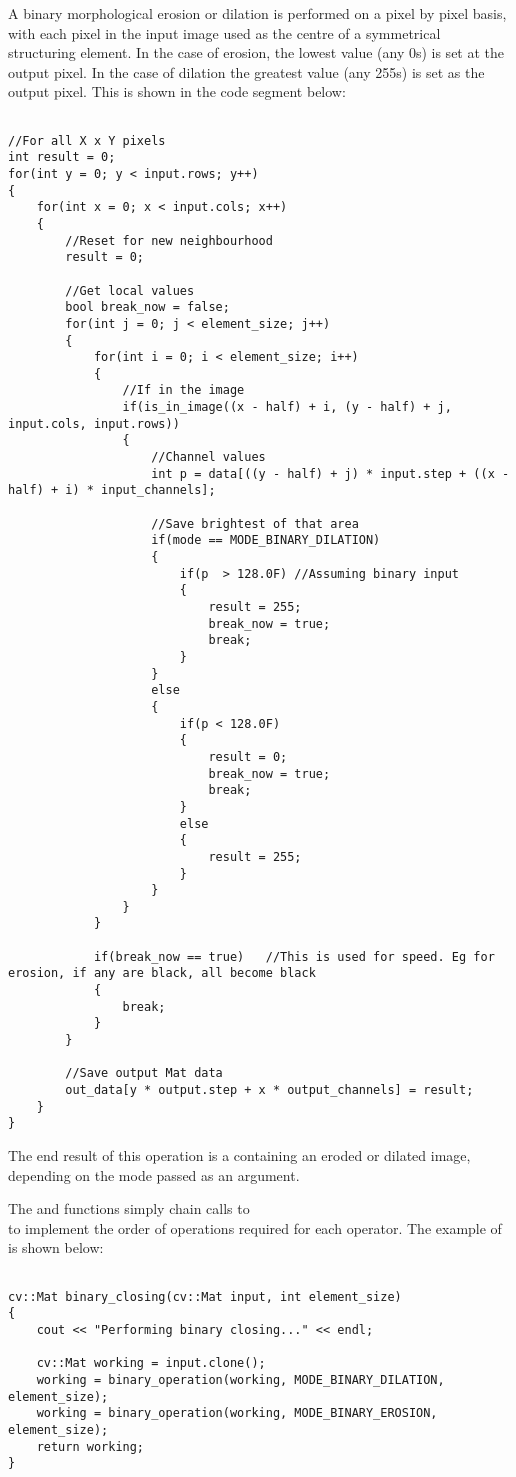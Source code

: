 			A binary morphological erosion or dilation is performed on a pixel by pixel basis, with each pixel in the input image used as the centre of a symmetrical structuring element. In the case of erosion, the lowest value (any 0s) is set at the output pixel. In the case of dilation the greatest value (any 255s) is set as the output pixel. This is shown in the code segment below:

			\begin{lstlisting}

//For all X x Y pixels
int result = 0;
for(int y = 0; y < input.rows; y++)
{
	for(int x = 0; x < input.cols; x++)
	{
		//Reset for new neighbourhood
		result = 0;
			
		//Get local values
		bool break_now = false;
		for(int j = 0; j < element_size; j++)
		{
			for(int i = 0; i < element_size; i++)
			{
				//If in the image
				if(is_in_image((x - half) + i, (y - half) + j, input.cols, input.rows))
				{
					//Channel values
					int p = data[((y - half) + j) * input.step + ((x - half) + i) * input_channels];

					//Save brightest of that area
					if(mode == MODE_BINARY_DILATION)
					{
						if(p  > 128.0F) //Assuming binary input
						{
							result = 255;
							break_now = true;
							break;
						}
					}
					else
					{
						if(p < 128.0F)
						{
							result = 0;
							break_now = true;
							break;
						}
						else
						{
							result = 255;
						}
					}
				}
			}

			if(break_now == true)   //This is used for speed. Eg for erosion, if any are black, all become black
			{
				break;
			}
		}
	
		//Save output Mat data
		out_data[y * output.step + x * output_channels] = result;
	}
}
			\end{lstlisting}

			The end result of this operation is a  containing an eroded or dilated image, depending on the mode passed as an argument. 

			The  and  functions simply chain calls to\\ to implement the order of operations required for each operator. The example of  is shown below:

			\begin{lstlisting}

cv::Mat binary_closing(cv::Mat input, int element_size)
{
	cout << "Performing binary closing..." << endl;

	cv::Mat working = input.clone();
	working = binary_operation(working, MODE_BINARY_DILATION, element_size);
	working = binary_operation(working, MODE_BINARY_EROSION, element_size);
	return working;
}
			\end{lstlisting}

